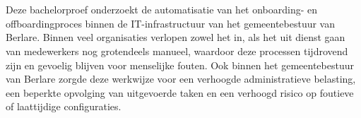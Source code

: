 
%
%
%
%
%

%



\chapter*{}

Deze bachelorproef onderzoekt de automatisatie van het onboarding- en offboardingproces binnen de IT-infrastructuur van het gemeentebestuur van Berlare. Binnen veel organisaties verlopen zowel het in, als het uit dienst gaan van medewerkers nog grotendeels manueel, waardoor deze processen tijdrovend zijn en gevoelig blijven voor menselijke fouten. Ook binnen het gemeentebestuur van Berlare zorgde deze werkwijze voor een verhoogde administratieve belasting, een beperkte opvolging van uitgevoerde taken en een verhoogd risico op foutieve of laattijdige configuraties.\newline

